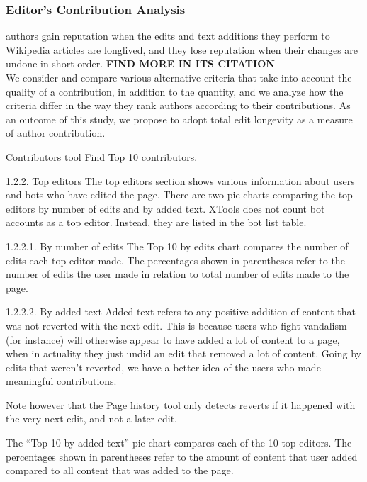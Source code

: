 \documentclass[12pt]{article}
\begin{document}
\subsubsection{Editor's Contribution Analysis}
\cite{adler2007content} authors gain reputation when the edits and text
additions they perform to Wikipedia articles are longlived, and they lose reputation when their changes are
undone in short order. \textbf{FIND MORE IN ITS CITATION} \\
\cite{adler2008measuring} We consider and compare various alternative criteria that take into account the quality of a contribution, in addition to the quantity, and we analyze how the criteria differ in the way they rank authors according to their contributions. As an outcome of this study, we propose to adopt total edit longevity as a measure of author contribution.

 Contributors tool 
 Find Top 10 contributors. 

1.2.2. Top editors
The top editors section shows various information about users and bots who have edited the page. There are two pie charts comparing the top editors by number of edits and by added text. XTools does not count bot accounts as a top editor. Instead, they are listed in the bot list table.

1.2.2.1. By number of edits
The Top 10 by edits chart compares the number of edits each top editor made. The percentages shown in parentheses refer to the number of edits the user made in relation to total number of edits made to the page.

1.2.2.2. By added text
Added text refers to any positive addition of content that was not reverted with the next edit. This is because users who fight vandalism (for instance) will otherwise appear to have added a lot of content to a page, when in actuality they just undid an edit that removed a lot of content. Going by edits that weren't reverted, we have a better idea of the users who made meaningful contributions.

Note however that the Page history tool only detects reverts if it happened with the very next edit, and not a later edit.

The “Top 10 by added text” pie chart compares each of the 10 top editors. The percentages shown in parentheses refer to the amount of content that user added compared to all content that was added to the page.
\end{document}
